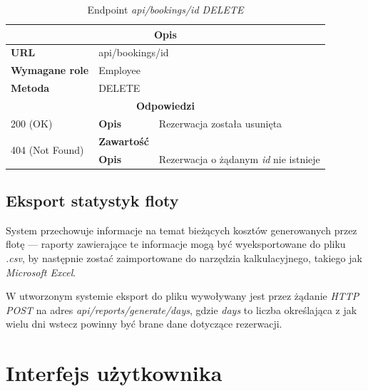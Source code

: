\documentclass[eng,printmode,openany]{mgr}
\begin{document}
	\begin{table}[H]
		\caption{Endpoint \textit{api/bookings/id DELETE}}
		\begin{tabularx}{\textwidth}{|l|l|X|}
			\hline
			\multicolumn{3}{|c|}{\textbf{\textbf{Opis}}}
			\\ \hline
			\textbf{URL}                       & \multicolumn{2}{l|}{api/bookings/id}
			\\ \hline
			\textbf{Wymagane role}             & \multicolumn{2}{l|}{Employee}
			\\ \hline
			\textbf{Metoda}                    & \multicolumn{2}{l|}{DELETE}
			\\ \hline
			\multicolumn{3}{|c|}{\textbf{Odpowiedzi}}
			\\ \hline
			200 (OK)			                & \textbf{Opis}         	& Rezerwacja została usunięta
			\\ \hline
			\multirow{2}{*}{404 (Not Found)} 	& \textbf{Zawartość}     & 
			\\ \cline{2-3}                      & \textbf{Opis}          & Rezerwacja o żądanym \textit{id} nie istnieje
			\\ \hline
		\end{tabularx}
	\end{table}
		
	\subsection{Eksport statystyk floty}
	System przechowuje informacje na temat bieżących kosztów generowanych przez flotę — raporty zawierające te informacje mogą być wyeksportowane do pliku \textit{.csv}, by następnie zostać zaimportowane do narzędzia kalkulacyjnego, takiego jak \textit{Microsoft Excel}.
	
	W utworzonym systemie eksport do pliku wywoływany jest przez żądanie \textit{HTTP POST} na adres \textit{api/reports/generate/days}, gdzie \textit{days} to liczba określająca z jak wielu dni wstecz powinny być brane dane dotyczące rezerwacji.
	
	
	
	\newpage
	\section{Interfejs użytkownika}
\end{document}
